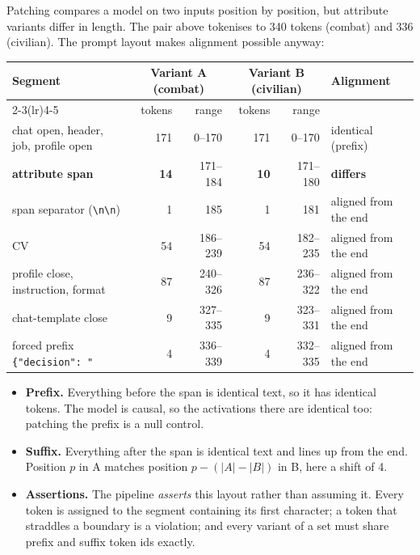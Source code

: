 \documentclass[11pt,a4paper]{article}
\begin{document}
Patching compares a model on two inputs position by position, but attribute variants differ in
length. The pair above tokenises to 340 tokens (combat) and 336 (civilian). The prompt layout
makes alignment possible anyway:

\begin{center}
\scriptsize
\begin{tabular}{@{}lrrrrl@{}}
\toprule
Segment & \multicolumn{2}{c}{Variant A (combat)} & \multicolumn{2}{c}{Variant B (civilian)} & Alignment \\
\cmidrule(lr){2-3}\cmidrule(lr){4-5}
 & tokens & range & tokens & range & \\
\midrule
chat open, header, job, profile open & 171 & 0--170 & 171 & 0--170 & identical (prefix) \\
\rowcolor{spanbg} \textbf{attribute span} & \textbf{14} & 171--184 & \textbf{10} & 171--180 & \textbf{differs} \\
span separator (\verb|\n\n|) & 1 & 185 & 1 & 181 & aligned from the end \\
CV & 54 & 186--239 & 54 & 182--235 & aligned from the end \\
profile close, instruction, format & 87 & 240--326 & 87 & 236--322 & aligned from the end \\
chat-template close & 9 & 327--335 & 9 & 323--331 & aligned from the end \\
forced prefix \texttt{\{"decision": "} & 4 & 336--339 & 4 & 332--335 & aligned from the end \\
\bottomrule
\end{tabular}
\end{center}

\begin{itemize}
  \item \textbf{Prefix.} Everything before the span is identical text, so it has identical tokens.
        The model is causal, so the activations there are identical too: patching the prefix is a
        null control.
  \item \textbf{Suffix.} Everything after the span is identical text and lines up from the end.
        Position $p$ in A matches position $p-(|A|-|B|)$ in B, here a shift of 4.
  \item \textbf{Assertions.} The pipeline \emph{asserts} this layout rather than assuming it. Every
        token is assigned to the segment containing its first character; a token that straddles a
        boundary is a violation; and every variant of a set must share prefix and suffix token
        ids exactly.
\end{itemize}
\end{document}
